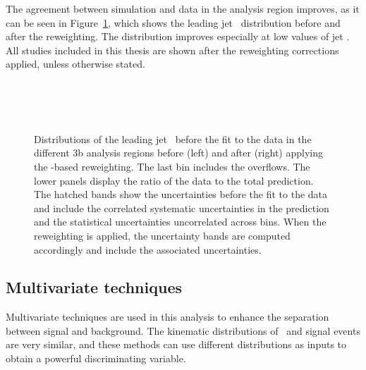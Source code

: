 The agreement between simulation and data in the analysis region improves, as it can be seen in Figure~\ref{tqX:RWeffect}, which shows the leading jet \pT\ distribution before and after the reweighting. The distribution improves especially at low values of jet \pT. All studies included in this thesis are shown after the reweighting corrections applied, unless otherwise stated.\\

\begin{figure}[htb]
    \RawFloats
    \begin{center}
     \\
     \\
     \\
    \caption{
    Distributions of the leading jet \pT\ before the fit to the data in the different 3b analysis regions before (left) and after (right) applying the \HTall-based reweighting. The last bin includes the overflows. 
    The lower panels display the ratio of the data to the total prediction.
    The hatched bands show the uncertainties before the fit to the data and include the correlated systematic uncertainties in the prediction and the statistical uncertainties uncorrelated across bins. When the reweighting is applied, the uncertainty bands are computed accordingly and include the associated uncertainties.    
    }
    \label{tqX:RWeffect}
\end{center}
\end{figure}
\clearpage
\subsection{Multivariate techniques}

Multivariate techniques are used in this analysis to enhance the separation between signal and background. The kinematic distributions of \ttb\ and signal events are very similar, and these methods can use different distributions as inputs to obtain a powerful discriminating variable.\\

